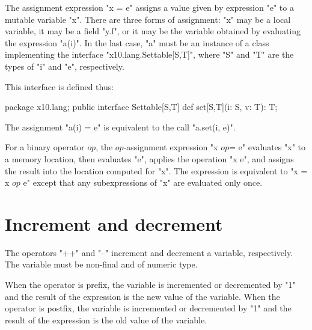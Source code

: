 The assignment expression \xcd"x = e" assigns a value given by
expression \xcd"e"
to a mutable variable \xcd"x".  There are three forms of
assignment: \xcd"x" may be a local variable, it may be a field
\xcd"y.f", or it may be the variable obtained by evaluating the expression \xcd"a(i)".
In the last case, \xcd"a" must be an instance of a class implementing the interface
 \xcd"x10.lang.Settable[S,T]", where 
\xcd"S" and \xcd"T" are the types of \xcd"i" and \xcd"e", respectively.

This interface is defined thus:
\begin{xten}
package x10.lang;
public interface Settable[S,T] {
    def set[S,T](i: S, v: T): T;
}
\end{xten}
The assignment \xcd"a(i) = e" is equivalent to the call
\xcd"a.set(i, e)".



For a binary operator
$\mathit{op}$,
the
$\mathit{op}$-assignment expression \xcdmath"x $\mathit{op}$= e"
evaluates \xcd"x" to a memory location, then evaluates \xcd"e",
applies the operation \xcdmath"x  e", and assigns the
result into the location computed for \xcd"x".
The expression is equivalent to \xcdmath"x = x $\mathit{op}$ e"
except that any subexpressions of \xcd"x" are evaluated only
once.


%


\section{Increment and decrement}

The operators \xcd"++" and \xcd"--" increment and decrement
a variable, respectively.  The variable must be non-final
and of numeric type.

When the operator is prefix, the variable is
incremented or decremented by \xcd"1" and the result of the expression is
the new value of the variable.
When the operator is postfix, the variable is incremented or
decremented by \xcd"1" and the result of the expression is the old value of
the variable.

